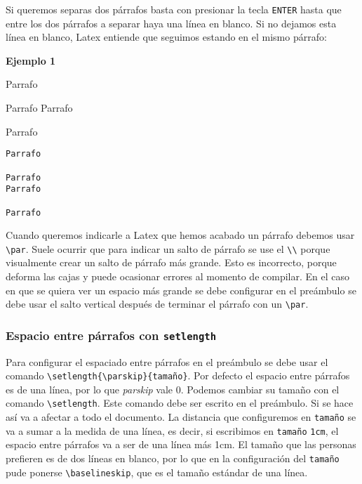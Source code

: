 	
	Si queremos separas dos párrafos basta con presionar la tecla \texttt{ENTER} hasta que entre los dos párrafos a separar haya una línea en blanco. Si no dejamos esta línea en blanco, Latex entiende que seguimos estando en el mismo párrafo:
	
	\textbf{Ejemplo 1}
	
	\begin{minipage}{\textwidth}
		Parrafo
				
		Parrafo		
		Parrafo
				
		Parrafo
	\end{minipage}	
	\begin{myquote}
		\begin{lstlisting}
Parrafo

Parrafo		
Parrafo

Parrafo
		\end{lstlisting}
	\end{myquote}
	
	
	Cuando queremos indicarle a Latex que hemos acabado un párrafo debemos usar \verb|\par|. Suele ocurrir que para indicar un salto de párrafo se use el \verb|\\| porque visualmente crear un salto de párrafo más grande. Esto es incorrecto, porque deforma las cajas y puede ocasionar errores al momento de compilar. En el caso en que se quiera ver un espacio más grande se debe configurar en el preámbulo se debe usar el salto vertical después de terminar el párrafo con un \verb|\par|.
	
	\subsubsection{Espacio entre párrafos con \texttt{setlength}}
	
	Para configurar el espaciado entre párrafos en el preámbulo se debe usar el comando \verb|\setlength{\parskip}{tamaño}|. Por defecto el espacio entre párrafos es de una línea, por lo que \textit{parskip} vale 0. Podemos cambiar su tamaño con el comando \verb|\setlength|. Este comando debe ser escrito en el preámbulo. Si se hace así va a afectar a todo el documento. La distancia que configuremos en \texttt{tamaño} se va a sumar a la medida de una línea, es decir, si escribimos en \texttt{tamaño} \texttt{1cm}, el espacio entre párrafos va a ser de una línea más 1cm. El tamaño que las personas prefieren es de dos líneas en blanco, por lo que en la configuración del \texttt{tamaño} pude ponerse \verb|\baselineskip|, que es el tamaño estándar de una línea.
	
